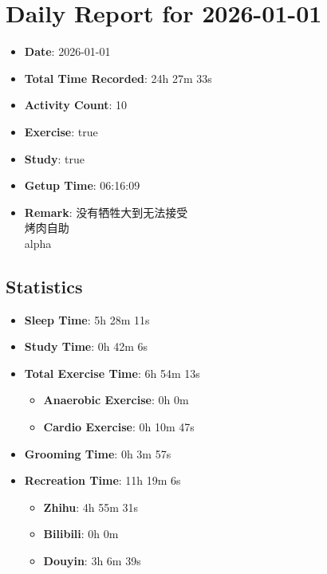 \documentclass[12pt]{extarticle}
\begin{document}
{\fontsize{18}{21.6}\selectfont\section*{Daily Report for 2026-01-01}}

\begin{itemize}[topsep=0pt, itemsep=-0.5ex]
    \item \textbf{Date}: 2026-01-01
    \item \textbf{Total Time Recorded}: 24h 27m 33s
    \item \textbf{Activity Count}: 10
    \item \textbf{Exercise}: true
    \item \textbf{Study}: true
    \item \textbf{Getup Time}: 06:16:09
    \item \textbf{Remark}: 没有牺牲大到无法接受\\
烤肉自助\\
alpha
\end{itemize}

{ \fontsize{16}{19}\selectfont \subsection*{Statistics}}

\begin{itemize}[topsep=0pt, itemsep=-0.5ex]
    \item \textbf{Sleep Time}: 5h 28m 11s
    \item \textbf{Study Time}: 0h 42m 6s
    \item \textbf{Total Exercise Time}: 6h 54m 13s
    \begin{itemize}[topsep=0pt, itemsep=-0.5ex]
        \item \textbf{Anaerobic Exercise}: 0h 0m
        \item \textbf{Cardio Exercise}: 0h 10m 47s
    \end{itemize}
    \item \textbf{Grooming Time}: 0h 3m 57s
    \item \textbf{Recreation Time}: 11h 19m 6s
    \begin{itemize}[topsep=0pt, itemsep=-0.5ex]
        \item \textbf{Zhihu}: 4h 55m 31s
        \item \textbf{Bilibili}: 0h 0m
        \item \textbf{Douyin}: 3h 6m 39s
    \end{itemize}
\end{itemize}
\end{document}
